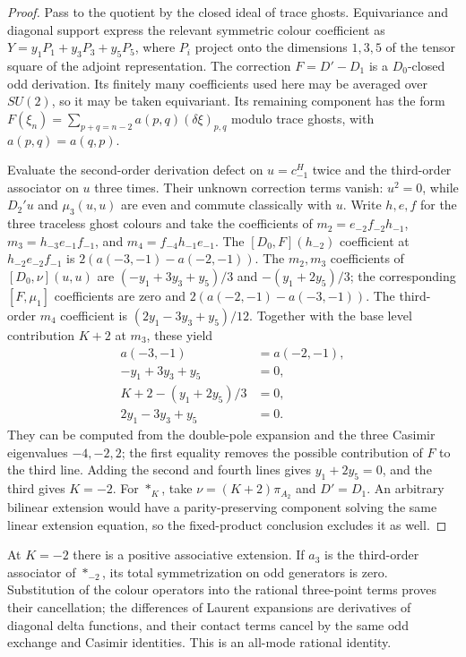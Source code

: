 \begin{proof}
Pass to the quotient by the closed ideal of trace ghosts.  Equivariance
and diagonal support express the relevant symmetric colour coefficient
as $Y=y_1P_1+y_3P_3+y_5P_5$, where $P_i$ project onto the
dimensions $1,3,5$ of the tensor square of the adjoint representation.
The correction $F=D'-D_1$ is a $D_0$-closed odd derivation.
Its finitely many coefficients used here may be averaged over $SU(2)$,
so it may be taken equivariant.  Its remaining component has the form
$F(\xi_n)=\sum_{p+q=n-2}a(p,q)(\delta\xi)_{p,q}$ modulo trace
ghosts, with $a(p,q)=a(q,p)$.

Evaluate the second-order derivation defect on $u=c_{-1}^H$ twice
and the third-order associator on $u$ three times.  Their unknown
correction terms vanish: $u^2=0$, while $D_2'u$ and $\mu_3(u,u)$
are even and commute classically with $u$.  Write $h,e,f$ for the
three traceless ghost colours and take the coefficients of
$m_2=e_{-2}f_{-2}h_{-1}$, $m_3=h_{-3}e_{-1}f_{-1}$, and
$m_4=f_{-4}h_{-1}e_{-1}$.  The $[D_0,F](h_{-2})$ coefficient
at $h_{-2}e_{-2}f_{-1}$ is
$2(a(-3,-1)-a(-2,-1))$.
The $m_2,m_3$ coefficients of $[D_0,\nu](u,u)$ are
$(-y_1+3y_3+y_5)/3$ and $-(y_1+2y_5)/3$; the corresponding
$[F,\mu_1]$ coefficients are zero and
$2(a(-2,-1)-a(-3,-1))$.
The third-order $m_4$ coefficient is
$(2y_1-3y_3+y_5)/12$.  Together with the base level contribution
$K+2$ at $m_3$, these yield
\[
 \begin{aligned}
 a(-3,-1)&=a(-2,-1),\\
 -y_1+3y_3+y_5&=0,\\
 K+2-(y_1+2y_5)/3&=0,\\
 2y_1-3y_3+y_5&=0.
 \end{aligned}
\]
They can be computed from the double-pole expansion and the three
Casimir eigenvalues $-4,-2,2$; the first equality removes the possible
contribution of $F$ to the third line.  Adding the second and fourth
lines gives $y_1+2y_5=0$, and the third gives $K=-2$.
For $*_K$, take $\nu=(K+2)\pi_{A_2}$ and $D'=D_1$.
An arbitrary bilinear extension would have a parity-preserving component
solving the same linear extension equation, so the fixed-product
conclusion excludes it as well.
\end{proof}

At $K=-2$ there is a positive associative extension.  If $a_3$ is
the third-order associator of $*_{-2}$, its total symmetrization on
odd generators is zero.  Substitution of the colour operators into
the rational three-point terms proves their cancellation; the
differences of Laurent expansions are derivatives of diagonal delta
functions, and their contact terms cancel by the same odd exchange
and Casimir identities.  This is an all-mode rational identity.

